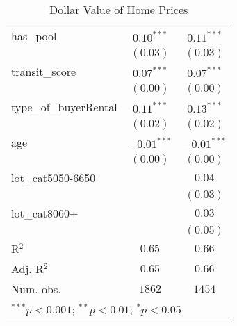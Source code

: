 \begin{table}
\begin{center}
\begin{tabular}{l c c}
has\_pool              & $0.10^{***}$  & $0.11^{***}$  \\
                       & $(0.03)$      & $(0.03)$      \\
transit\_score         & $0.07^{***}$  & $0.07^{***}$  \\
                       & $(0.00)$      & $(0.00)$      \\
type\_of\_buyerRental  & $0.11^{***}$  & $0.13^{***}$  \\
                       & $(0.02)$      & $(0.02)$      \\
age                    & $-0.01^{***}$ & $-0.01^{***}$ \\
                       & $(0.00)$      & $(0.00)$      \\
lot\_cat5050-6650      &               & $0.04$        \\
                       &               & $(0.03)$      \\
lot\_cat8060+          &               & $0.03$        \\
                       &               & $(0.05)$      \\
\hline
R$^2$                  & $0.65$        & $0.66$        \\
Adj. R$^2$             & $0.65$        & $0.66$        \\
Num. obs.              & $1862$        & $1454$        \\
\hline
\multicolumn{3}{l}{\scriptsize{$^{***}p<0.001$; $^{**}p<0.01$; $^{*}p<0.05$}}
\end{tabular}
\caption{Dollar Value of Home Prices}
\label{tab:lot_cat}
\end{center}
\end{table}
